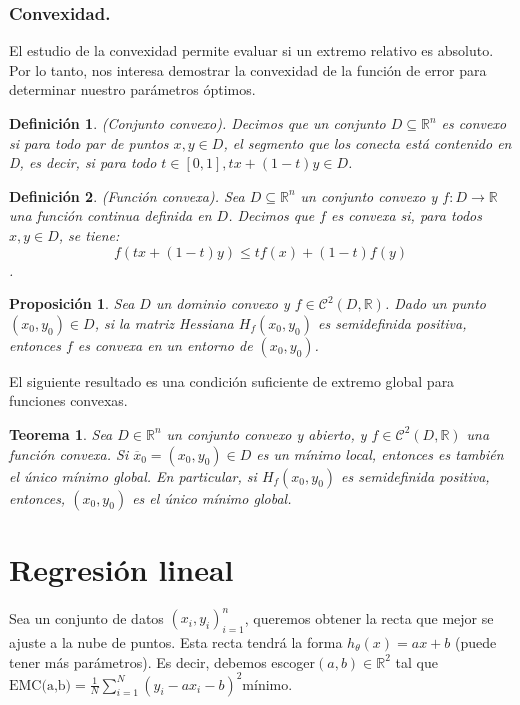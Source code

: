 \documentclass[a4paper,10pt]{article}
\newtheorem{theorem}{Teorema}
\newtheorem{proposition}{Proposición}
\newtheorem{definition}{Definición}
\begin{document}
\subsubsection{Convexidad.}

El estudio de la convexidad permite evaluar si un extremo relativo es absoluto. Por lo tanto, nos interesa demostrar la convexidad de la función de error para determinar nuestro parámetros óptimos.\\

\begin{definition}(Conjunto convexo). Decimos que un conjunto $D\subseteq \mathbb{R}^n$
es convexo si para todo par de puntos $x,y \in D$, el segmento que los conecta está contenido en D, es decir, si para todo $t\in[0,1],tx+(1-t)y\in D$.
\end{definition}
\begin{definition} (Función convexa). Sea $D\subseteq \mathbb{R}^n$ un conjunto convexo y $f: D\rightarrow \mathbb{R}$ una función continua definida en $D$. Decimos que $f$ es convexa si, para todos $x,y\in D$, se tiene:
\[
f(tx+(1-t)y) \leq tf(x)+(1-t)f(y)
\].
\end{definition}

\begin{proposition}
Sea $D$ un dominio convexo y $f\in\mathcal{C}^2(D,\mathbb{R})$. Dado un punto
$(x_0, y_0) \in D$, si la matriz Hessiana $H_f (x_0, y_0)$ es semidefinida positiva, entonces
$f$ es convexa en un entorno de $(x_0, y_0)$.
\end{proposition}
\noindent
El siguiente resultado es una condición suficiente de extremo global para funciones convexas.
\begin{theorem}
Sea $D\in\mathbb{R}^n$ un conjunto convexo y abierto, y $f\in\mathcal{C}^2(D,\mathbb{R})$ una función convexa. Si $\overline{x}_0=(x_0,y_0)\in D$ es un mínimo local, entonces es también el único mínimo global. En particular, si $H_f(x_0,y_0)$ es semidefinida positiva, entonces, $(x_0,y_0)$ es el único mínimo global.
\end{theorem}
\newpage
\section{Regresión lineal}

Sea un conjunto de datos $(x_i,y_i)^n_{i=1}$, queremos obtener la recta que mejor se ajuste a la nube de puntos. Esta recta tendrá la forma $h_\theta(x)= ax+b$ (puede tener  más parámetros). Es decir, debemos escoger$  (a,b)\in \mathbb{R}^2 $ tal que $\text{EMC(a,b)} = \frac{1}{N} \sum_{i=1}^{N}(y_{i}-ax_{i}-b)^2 \text{mínimo.} $
\end{document}

